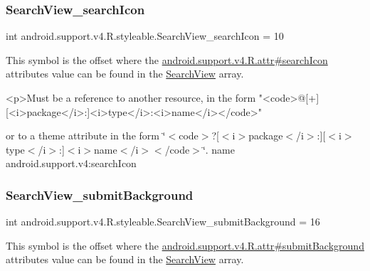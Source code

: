 \subsubsection{\texorpdfstring{Search\+View\+\_\+search\+Icon}{SearchView\_searchIcon}}
{\footnotesize\ttfamily int android.\+support.\+v4.\+R.\+styleable.\+Search\+View\+\_\+search\+Icon = 10\hspace{0.3cm}{\ttfamily [static]}}

This symbol is the offset where the \hyperlink{classandroid_1_1support_1_1v4_1_1R_1_1attr_ac9676ddfff5eaae3a4675c648675472f}{android.\+support.\+v4.\+R.\+attr\#search\+Icon} attribute\textquotesingle{}s value can be found in the \hyperlink{classandroid_1_1support_1_1v4_1_1R_1_1styleable_a7f709410d566e9fd5d4c710e815c300a}{Search\+View} array.

\begin{DoxyVerb}      <p>Must be a reference to another resource, in the form "<code>@[+][<i>package</i>:]<i>type</i>:<i>name</i></code>"
\end{DoxyVerb}
 or to a theme attribute in the form \char`\"{}$<$code$>$?\mbox{[}$<$i$>$package$<$/i$>$\+:\mbox{]}\mbox{[}$<$i$>$type$<$/i$>$\+:\mbox{]}$<$i$>$name$<$/i$>$$<$/code$>$\char`\"{}.  name android.\+support.\+v4\+:search\+Icon \mbox{\label{classandroid_1_1support_1_1v4_1_1R_1_1styleable_ad5c34c512b8b52cc4e15a14f900ed036}} 
\subsubsection{\texorpdfstring{Search\+View\+\_\+submit\+Background}{SearchView\_submitBackground}}
{\footnotesize\ttfamily int android.\+support.\+v4.\+R.\+styleable.\+Search\+View\+\_\+submit\+Background = 16\hspace{0.3cm}{\ttfamily [static]}}

This symbol is the offset where the \hyperlink{classandroid_1_1support_1_1v4_1_1R_1_1attr_a02223c24d2cfe93197a2ab46075d2c1a}{android.\+support.\+v4.\+R.\+attr\#submit\+Background} attribute\textquotesingle{}s value can be found in the \hyperlink{classandroid_1_1support_1_1v4_1_1R_1_1styleable_a7f709410d566e9fd5d4c710e815c300a}{Search\+View} array.

